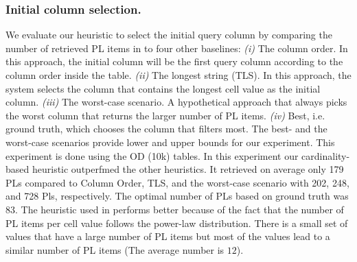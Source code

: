 \subsubsection{Initial column selection.}
%
We evaluate our heuristic to select the initial query column by comparing the number of retrieved PL items in \system to four other baselines:
\textit{(i)} The column order. In this approach, the initial column will be the first query column according to the column order inside the table. %
\textit{(ii)} The longest string (TLS). In this approach, the system selects the column that contains the longest cell value as the initial column. %
\textit{(iii)} The worst-case scenario. A hypothetical approach that always picks the worst column that returns the larger number of PL items.
\textit{(iv)} Best, i.e. ground truth, which chooses the column that filters most.
The best- and the worst-case scenarios provide lower and upper bounds for our experiment.
This experiment is done using the OD (10k) tables.
In this experiment our cardinality-based heuristic outperfmed the other heuristics. It retrieved on average only 179 PLs compared to Column Order, TLS, and the worst-case scenario with 202, 248, and 728 Pls, respectively. The optimal number of PLs based on ground truth was 83. The heuristic used in \system performs better because of the fact that the number of PL items per cell value follows the power-law distribution. There is a small set of values that have a large number of PL items but most of the values lead to a similar number of PL items (The average number is $12$).




